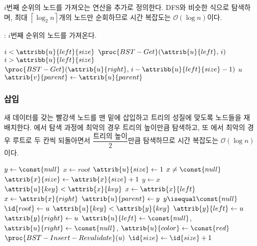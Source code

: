 $i$번째 순위의 노드를 가져오는 연산을 추가로 정의한다. DFS와 비슷한 식으로 탐색하며, 최대 $\left\lceil\log_2 n\right\rceil$개의 노드만 순회하므로
시간 복잡도는 $\mathcal{O}\left(\log n\right)$이다.

: $i$번째 순위의 노드를 가져온다.

\begin{codebox}
\li \If $i < \attribb{u}{left}{size}$ \Then
\li     \Return $\proc{BST-Get}(\attrib{u}{left},\,i)$
\li \ElseIf $i > \attribb{u}{left}{size}$ \Then
\li     \Return $\proc{BST-Get}(\attrib{u}{right},\,i-\attribb{u}{left}{size}-1)$
\li \ElseNoIf
\li     \Return $u$
    \End
\li $\attrib{v}{parent} \gets \attrib{u}{parent}$
\end{codebox}

\newpage

\subsubsection{삽입} 새 데이터를 갖는 빨강색 노드를 맨 밑에 삽입하고 트리의 성질에 맞도록 노드들을 재배치한다.
에서 탐색 과정에 최악의 경우 트리의 높이만큼 탐색하고, 또 에서 최악의 경우
루트로 두 칸씩 되돌아면서 $\dfrac{\mbox{트리의 높이}}{2}$만큼 탐색하므로 시간 복잡도는 $\mathcal{O}\left(\log n\right)$이다.

\begin{codebox}
\li $y \gets \const{null}$
\li $x \gets root$
\li $\attrib{u}{size} \gets 1$
\li \While $x \neq \const{null}$ \Do
\li     $\attrib{x}{size} \gets \attrib{x}{size} + 1$
\li     $y \gets x$
\li     \If $\attrib{u}{key} < \attrib{x}{key}$ \Then
\li         $x \gets \attrib{x}{left}$
\li     \ElseNoIf
\li         $x \gets \attrib{x}{right}$
        \End
    \End
\li $\attrib{u}{parent} \gets y$
\li \If $y \isequal \const{null}$ \Then
\li     $\id{root} \gets u$
\li \ElseIf $\attrib{u}{key} < \attrib{y}{key}$ \Then
\li     $\attrib{y}{left} \gets u$
\li \ElseNoIf
\li     $\attrib{y}{right} \gets u$
    \End
\li $\attrib{u}{left} \gets \const{null}$, $\attrib{u}{right} \gets \const{null}$, $\attrib{u}{color} \gets \const{red}$ 
\li $\proc{BST-Insert-Revalidate}(u)$
\li $\id{size} \gets \id{size} + 1$
\end{codebox}

\newpage
    
